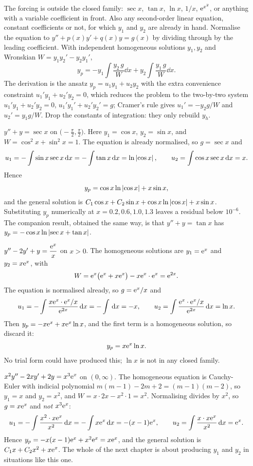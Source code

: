 \cue The forcing is outside the closed family: $\sec x$, $\tan x$, $\ln x$, $1/x$, $\mathrm{e}^{x^{2}}$, or anything with a variable coefficient in front. Also any second-order linear equation, constant coefficients or not, for which $y_1$ and $y_2$ are already in hand.
\method Normalise the equation to $y''+p(x)y'+q(x)y=g(x)$ by dividing through by the leading coefficient. With independent homogeneous solutions $y_1,y_2$ and Wronskian $W=y_1y_2'-y_2y_1'$,
\[y_p=-y_1\int\frac{y_2\,g}{W}\dd x+y_2\int\frac{y_1\,g}{W}\dd x.\]
The derivation is the ansatz $y_p=u_1y_1+u_2y_2$ with the extra convenience constraint $u_1'y_1+u_2'y_2=0$, which reduces the problem to the two-by-two system $u_1'y_1+u_2'y_2=0$, $u_1'y_1'+u_2'y_2'=g$; Cramer's rule gives $u_1'=-y_2g/W$ and $u_2'=y_1g/W$. Drop the constants of integration: they only rebuild $y_h$.

\begin{worked}
$y''+y=\sec x$ on $\bigl(-\tfrac{\pi}{2},\tfrac{\pi}{2}\bigr)$. Here $y_1=\cos x$, $y_2=\sin x$, and $W=\cos^{2}x+\sin^{2}x=1$. The equation is already normalised, so $g=\sec x$ and
\[u_1=-\int\sin x\sec x\,\mathrm{d} x=-\int\tan x\,\mathrm{d} x=\ln\left\lvert \cos x\right\rvert,\qquad u_2=\int\cos x\sec x\,\mathrm{d} x=x.\]
Hence
\[y_p=\cos x\ln\left\lvert \cos x\right\rvert+x\sin x,\]
and the general solution is $C_1\cos x+C_2\sin x+\cos x\ln\left\lvert \cos x\right\rvert+x\sin x$. Substituting $y_p$ numerically at $x=0.2,0.6,1.0,1.3$ leaves a residual below $10^{-6}$. The companion result, obtained the same way, is that $y''+y=\tan x$ has $y_p=-\cos x\ln\left\lvert \sec x+\tan x\right\rvert$.
\end{worked}

\begin{worked}
$y''-2y'+y=\dfrac{\mathrm{e}^{x}}{x}$ on $x>0$. The homogeneous solutions are $y_1=\mathrm{e}^{x}$ and $y_2=x\mathrm{e}^{x}$, with
\[W=\mathrm{e}^{x}\bigl(\mathrm{e}^{x}+x\mathrm{e}^{x}\bigr)-x\mathrm{e}^{x}\cdot\mathrm{e}^{x}=\mathrm{e}^{2x}.\]
The equation is normalised already, so $g=\mathrm{e}^{x}/x$ and
\[u_1=-\int\frac{x\mathrm{e}^{x}\cdot\mathrm{e}^{x}/x}{\mathrm{e}^{2x}}\,\mathrm{d} x=-\int\,\mathrm{d} x=-x,\qquad u_2=\int\frac{\mathrm{e}^{x}\cdot\mathrm{e}^{x}/x}{\mathrm{e}^{2x}}\,\mathrm{d} x=\ln x.\]
Then $y_p=-x\mathrm{e}^{x}+x\mathrm{e}^{x}\ln x$, and the first term is a homogeneous solution, so discard it:
\[y_p=x\mathrm{e}^{x}\ln x.\]
No trial form could have produced this; $\ln x$ is not in any closed family.
\end{worked}

\begin{worked}
$x^{2}y''-2xy'+2y=x^{3}\mathrm{e}^{x}$ on $(0,\infty)$. The homogeneous equation is Cauchy-Euler with indicial polynomial $m(m-1)-2m+2=(m-1)(m-2)$, so $y_1=x$ and $y_2=x^{2}$, and $W=x\cdot2x-x^{2}\cdot1=x^{2}$. Normalising divides by $x^{2}$, so $g=x\mathrm{e}^{x}$ and \emph{not} $x^{3}\mathrm{e}^{x}$:
\[u_1=-\int\frac{x^{2}\cdot x\mathrm{e}^{x}}{x^{2}}\,\mathrm{d} x=-\int x\mathrm{e}^{x}\,\mathrm{d} x=-(x-1)\mathrm{e}^{x},\qquad u_2=\int\frac{x\cdot x\mathrm{e}^{x}}{x^{2}}\,\mathrm{d} x=\mathrm{e}^{x}.\]
Hence $y_p=-x(x-1)\mathrm{e}^{x}+x^{2}\mathrm{e}^{x}=x\mathrm{e}^{x}$, and the general solution is $C_1x+C_2x^{2}+x\mathrm{e}^{x}$. The whole of the next chapter is about producing $y_1$ and $y_2$ in situations like this one.
\end{worked}

